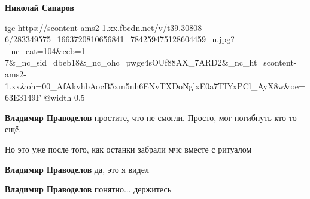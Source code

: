 \textbf{Николай Сапаров}

\ifcmt
  igc https://scontent-ams2-1.xx.fbcdn.net/v/t39.30808-6/283349575_1663720810656841_784259475128604459_n.jpg?_nc_cat=104&ccb=1-7&_nc_sid=dbeb18&_nc_ohc=pwge4sOUf88AX_7ARD2&_nc_ht=scontent-ams2-1.xx&oh=00_AfAkvhbAocB5xm5nh6ENvTXDoNglxE0a7TIYxPCl_AyX8w&oe=63E3149F
	@width 0.5
\fi

\raggedcolumns
\begin{multicols}{2} %
\setlength{\parindent}{0pt}

\begin{itemize} %

\textbf{Владимир Праводелов} простите, что не смогли. Просто, мог погибнуть кто-то ещё.

Но это уже после того, как останки забрали мчс вместе с ритуалом

\textbf{Владимир Праводелов} да, это я видел

\textbf{Владимир Праводелов} понятно... держитесь

\end{itemize} %
\end{multicols} %

